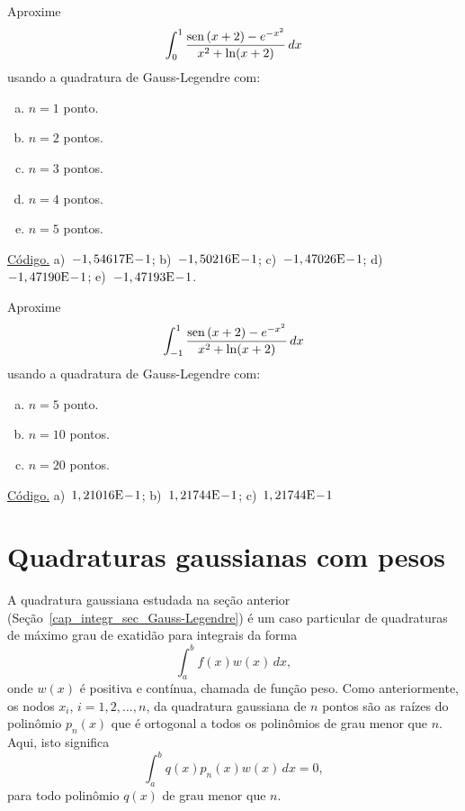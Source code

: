 \begin{exer}\label{exer:GL_mudvar}
  Aproxime
  \begin{equation}
    \int_{0}^1 \frac{\operatorname{sen}\,(x+2)-e^{-x^2}}{x^2+\ln(x+2)}\,dx
  \end{equation}
usando a quadratura de Gauss-Legendre com:
\begin{enumerate}[a)]
\item $n=1$ ponto.
\item $n=2$ pontos.
\item $n=3$ pontos.
\item $n=4$ pontos.
\item $n=5$ pontos.
\end{enumerate}
\end{exer}
\begin{resp}
  \ifisoctave 
  \href{https://github.com/phkonzen/notas/blob/master/src/MatematicaNumerica/cap_integr/dados/exer_GL_mudvar/exer_GL_mudvar.m}{Código.} 
  \fi
  a)~$-1,54617\mathrm{E}\!-\!1$; b)~$-1,50216\mathrm{E}\!-\!1$; c)~$-1,47026\mathrm{E}\!-\!1$; d)~$-1,47190\mathrm{E}\!-\!1$; e)~$-1,47193\mathrm{E}\!-\!1$.
\end{resp}

\begin{exer}\label{exer:GL_Npts}
  Aproxime
  \begin{equation}
    \int_{-1}^1 \frac{\operatorname{sen}\,(x+2)-e^{-x^2}}{x^2+\ln(x+2)}\,dx
  \end{equation}
usando a quadratura de Gauss-Legendre com:
\begin{enumerate}[a)]
\item $n=5$ ponto.
\item $n=10$ pontos.
\item $n=20$ pontos.
\end{enumerate}
\end{exer}
\begin{resp}
  \ifisoctave 
  \href{https://github.com/phkonzen/notas/blob/master/src/MatematicaNumerica/cap_integr/dados/exer_GL_Npts/exer_GL_Npts.m}{Código.} 
  \fi
  a)~$1,21016\mathrm{E}\!-\!1$; b)~$1,21744\mathrm{E}\!-\!1$; c)~$1,21744\mathrm{E}\!-\!1$
\end{resp}

\section{Quadraturas gaussianas com pesos}\label{cap_integr_sec_Gauss_peso}

A quadratura gaussiana estudada na seção anterior (Seção~\ref{cap_integr_sec_Gauss-Legendre}) é um caso particular de quadraturas de máximo grau de exatidão para integrais da forma
\begin{equation}
  \int_a^b f(x)w(x)\,dx,
\end{equation}
onde $w(x)$ é positiva e contínua, chamada de função peso. Como anteriormente, os nodos $x_i$, $i=1, 2, \dotsc, n$, da quadratura gaussiana de $n$ pontos são as raízes do polinômio $p_n(x)$ que é ortogonal a todos os polinômios de grau menor que $n$. Aqui, isto significa
\begin{equation}
  \int_a^b q(x)p_n(x)w(x)\,dx = 0,
\end{equation}
para todo polinômio $q(x)$ de grau menor que $n$.

